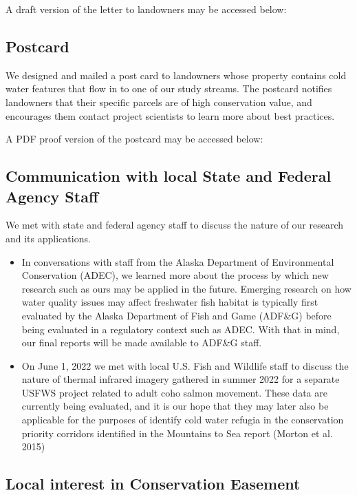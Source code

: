 \documentclass[
  letterpaper,
  DIV=11,
  numbers=noendperiod]{scrreprt}
\begin{document}
A draft version of the letter to landowners may be accessed below:

\hypertarget{postcard}{%
\subsection{Postcard}\label{postcard}}

We designed and mailed a post card to landowners whose property contains
cold water features that flow in to one of our study streams. The
postcard notifies landowners that their specific parcels are of high
conservation value, and encourages them contact project scientists to
learn more about best practices.

A PDF proof version of the postcard may be accessed below:

\hypertarget{communication-with-local-state-and-federal-agency-staff}{%
\subsection{Communication with local State and Federal Agency
Staff}\label{communication-with-local-state-and-federal-agency-staff}}

We met with state and federal agency staff to discuss the nature of our
research and its applications.

\begin{itemize}
\item
  In conversations with staff from the Alaska Department of
  Environmental Conservation (ADEC), we learned more about the process
  by which new research such as ours may be applied in the future.
  Emerging research on how water quality issues may affect freshwater
  fish habitat is typically first evaluated by the Alaska Department of
  Fish and Game (ADF\&G) before being evaluated in a regulatory context
  such as ADEC. With that in mind, our final reports will be made
  available to ADF\&G staff.
\item
  On June 1, 2022 we met with local U.S. Fish and Wildlife staff to
  discuss the nature of thermal infrared imagery gathered in summer 2022
  for a separate USFWS project related to adult coho salmon movement.
  These data are currently being evaluated, and it is our hope that they
  may later also be applicable for the purposes of identify cold water
  refugia in the conservation priority corridors identified in the
  Mountains to Sea report (Morton et al. 2015)
\end{itemize}

\hypertarget{local-interest-in-conservation-easement}{%
\subsection{Local interest in Conservation
Easement}\label{local-interest-in-conservation-easement}}
\end{document}
